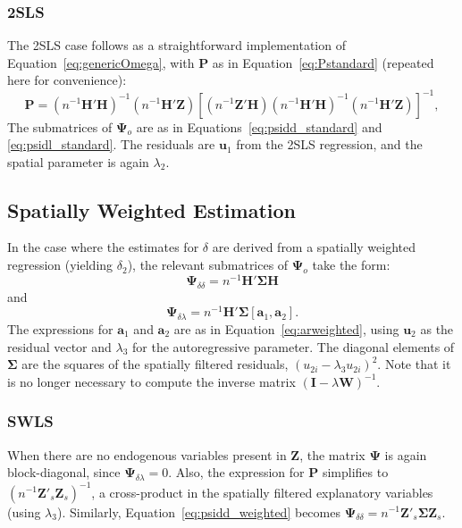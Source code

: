 \documentclass{article}
\begin{document}
\subsubsection{2SLS}\label{ss:asyvar2sls}
The 2SLS case follows as a straightforward implementation of Equation~\ref{eq:genericOmega},
with $\mathbf{P}$ as in Equation~\ref{eq:Pstandard} (repeated here for convenience):
\begin{equation*}
\mathbf{P} = (n^{-1}\mathbf{H'H})^{-1} ( n^{-1} \mathbf{H'Z} ) 
        [ (n^{-1} \mathbf{Z'H} ) (n^{-1} \mathbf{H'H} )^{-1} (n^{-1} \mathbf{H'Z}) ]^{-1},
\end{equation*}
The submatrices of $\mathbf{\Psi}_o$ are as in Equations~\ref{eq:psidd_standard}
and \ref{eq:psidl_standard}. The residuals are $\mathbf{u}_1$ from the 2SLS regression,
and the spatial parameter is again $\lambda_2$.

\subsection{Spatially Weighted Estimation}\label{ss:asyvarweighted}
In the case where the estimates for $\delta$ are derived from a spatially weighted
regression (yielding $\delta_2$), the relevant submatrices of $\mathbf{\Psi}_o$ take the form:
\begin{equation}\label{eq:psidd_weighted}
\mathbf{\Psi}_{\delta \delta} = n^{-1} \mathbf{H'}  \mathbf{\Sigma}
 \mathbf{H}
\end{equation}
and
\begin{equation}\label{eq:psidl_weighted}
\mathbf{\Psi}_{\delta \lambda} = n^{-1} \mathbf{H'} \mathbf{\Sigma} [ \mathbf{a}_1, \mathbf{a}_2 ].
\end{equation}
The expressions for $\mathbf{a}_1$ and $\mathbf{a}_2$ are as in Equation~\ref{eq:arweighted}, using  $\mathbf{u}_2$ as the residual vector and $\lambda_3$ for the 
autoregressive parameter. The diagonal elements
of $\mathbf{\Sigma}$ are the squares of the spatially filtered residuals, $(u_{2i} - \lambda_3 u_{2i} )^{2}$.
Note that it is no longer necessary to compute the inverse matrix $( \mathbf{I} - \lambda \mathbf{W} )^{-1}$. 

\subsubsection{SWLS}
When there are no endogenous variables present in $\mathbf{Z}$, the matrix $\mathbf{\Psi}$
is again block-diagonal, since $\mathbf{\Psi}_{\delta \lambda} = 0$. Also, the expression for 
$\mathbf{P}$ simplifies to $(n^{-1} \mathbf{Z'}_s\mathbf{Z}_s )^{-1}$, a cross-product in the
spatially filtered explanatory variables (using $\lambda_3$). Similarly, 
Equation~\ref{eq:psidd_weighted} becomes $\mathbf{\Psi}_{\delta \delta} = n^{-1} \mathbf{Z'}_s \mathbf{\Sigma} \mathbf{Z}_s$.
\end{document}
